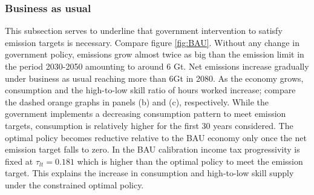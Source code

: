 \subsubsection{Business as usual}\label{subsub:bau}
This subsection serves to underline that government intervention to satisfy emission targets is necessary. Compare figure \ref{fig:BAU}.  Without any change in government policy, emissions grow almost twice as big than the emission limit in the period 2030-2050 amounting to around 6 Gt. Net emissions increase gradually under business as usual reaching more than 6Gt in 2080. 
As the economy grows, consumption and the high-to-low skill ratio of hours worked increase; compare the dashed orange graphs in panels (b) and (c), respectively. While the government implements a decreasing consumption pattern to meet emission targets, consumption is relatively higher for the first 30 years considered. The optimal policy becomes reductive relative to the BAU economy only once the net emission target falls to zero. In the BAU calibration income tax progressivity is fixed at $\tau_{lt}=0.181$ which is higher than the optimal policy to meet the emission target. This explains the increase in consumption and high-to-low skill supply under the constrained optimal policy. 

